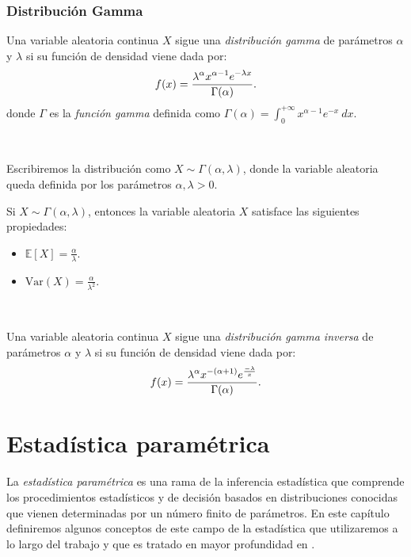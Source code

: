 \documentclass[oneside,openright,titlepage,numbers=noenddot,openany,headinclude,footinclude=true,
cleardoublepage=empty,abstractoff,BCOR=5mm,paper=a4,fontsize=12pt,main=spanish]{scrreprt}
\begin{document}
\subsection{Distribución Gamma}

\begin{definition}
Una variable aleatoria continua $X$ sigue una \textit{distribución gamma} de parámetros $\alpha$ y $\lambda$ si su función de densidad viene dada por: $$f(x)=\frac{\displaystyle \lambda^{\alpha}x^{\alpha-1}e^{-\lambda x}}{\displaystyle \Gamma(\alpha)}.$$
donde $\Gamma$ es la \textit{función gamma} definida como $\Gamma(\alpha)=\displaystyle \int_0^{+\infty}x^{\alpha-1}e^{-x} \ dx$.
\end{definition}\

Escribiremos la distribución como $X \sim \Gamma(\alpha,\lambda)$, donde la variable aleatoria queda definida por los parámetros $\alpha,\lambda > 0$.\\

\begin{proposition}[Propiedades]
Si $X \sim \Gamma(\alpha,\lambda)$, entonces la variable aleatoria $X$ satisface las siguientes propiedades:
\begin{itemize}
    \item $\mathbb{E}[X]=\frac{\alpha}{\lambda}$.
    \item $\text{Var}(X)=\frac{\alpha}{\lambda^2}$.
\end{itemize}
\end{proposition}\

\begin{definition}
Una variable aleatoria continua $X$ sigue una \textit{distribución gamma inversa} de parámetros $\alpha$ y $\lambda$ si su función de densidad viene dada por: $$f(x)=\frac{\displaystyle \lambda^\alpha x^{-(\alpha+1)} e^{\frac{-\lambda}{x}}}{\displaystyle \Gamma(\alpha)}.$$
\end{definition}

\chapter{Estadística paramétrica}

La \textit{estadística paramétrica} es una rama de la inferencia estadística que comprende los procedimientos estadísticos y de decisión basados en distribuciones conocidas que vienen determinadas por un número finito de parámetros. En este capítulo definiremos algunos conceptos de este campo de la estadística que utilizaremos a lo largo del trabajo y que es tratado en mayor profundidad en \cite{inferencia2012}.\\
\end{document}
